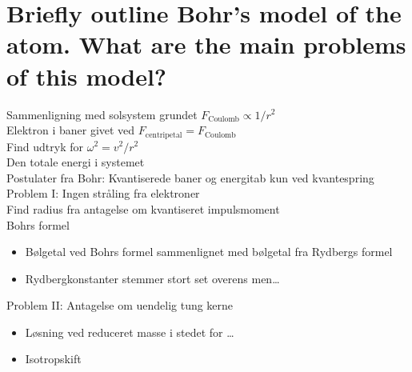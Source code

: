 \section{Briefly outline Bohr's model of the atom. What are the main problems of this model?}

\noindent
\Large
Sammenligning med solsystem grundet $F_\text{Coulomb} \propto 1/r^2$\\
Elektron i baner givet ved $F_\text{centripetal} = F_\text{Coulomb}$\\
Find udtryk for $\omega^2 = v^2/r^2$\\
Den totale energi i systemet\\
Postulater fra Bohr: Kvantiserede baner og energitab kun ved kvantespring\\
Problem I: Ingen stråling fra elektroner\\
Find radius fra antagelse om kvantiseret impulsmoment\\
Bohrs formel
\begin{itemize}
    \item Bølgetal ved Bohrs formel sammenlignet med bølgetal fra Rydbergs formel
    \item Rydbergkonstanter stemmer stort set overens men\ldots
\end{itemize}
Problem II: Antagelse om uendelig tung kerne
\begin{itemize}
    \item Løsning ved reduceret masse i stedet for \ldots
    \item Isotropskift
\end{itemize}
\normalsize